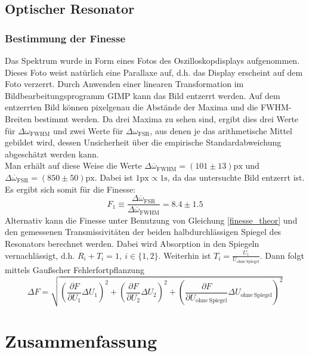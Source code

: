 \documentclass[11pt,a4paper,oneside]{scrartcl}
\begin{document}
\subsection{Optischer Resonator}
\subsubsection{Bestimmung der Finesse}
Das Spektrum wurde in Form eines Fotos des Oszilloskopdisplays aufgenommen. Dieses Foto weist natürlich eine Parallaxe auf, d.h. das Display erscheint auf dem Foto verzerrt. Durch Anwenden einer linearen Transformation im Bildbearbeitungsprogramm GIMP kann das Bild entzerrt werden. Auf dem entzerrten Bild können pixelgenau die Abstände der Maxima und die FWHM-Breiten bestimmt werden. Da drei Maxima zu sehen sind, ergibt dies drei Werte für $\Delta\omega_{\mathrm{FWHM}}$ und zwei Werte für $\Delta\omega_{\mathrm{FSR}}$, aus denen je das arithmetische Mittel gebildet wird, dessen Unsicherheit über die empirische Standardabweichung abgeschätzt werden kann.\\
Man erhält auf diese Weise die Werte $\Delta\overline\omega_{\mathrm{FWHM}}=(101\pm13)\mathrm{px}$ und $\Delta\overline\omega_{\mathrm{FSR}}=(850\pm50)\mathrm{px}$. Dabei ist $1\mathrm{px}\propto 1\mathrm s$, da das untersuchte Bild entzerrt ist. \\
Es ergibt sich somit für die Finesse:
\begin{equation}
F_1\equiv \frac{\Delta\overline\omega_{\mathrm{FSR}}}{\Delta\overline\omega_{\mathrm{FWHM}}}=8.4\pm1.5
\end{equation}
Alternativ kann die Finesse unter Benutzung von Gleichung \ref{finesse_theor} und den gemessenen Transmissivitäten der beiden halbdurchlässigen Spiegel des Resonators berechnet werden. Dabei wird Absorption in den Spiegeln vernachlässigt, d.h. $R_i+T_i=1,\ i\in\{1,2\}$. Weiterhin ist $T_i=\frac{U_i}{U_{\mathrm{ohne}\ \mathrm{Spiegel}}}$. Dann folgt mittels Gaußscher Fehlerfortpflanzung \begin{equation}
\Delta F = \sqrt{\left(\frac{\partial F}{\partial U_1}\Delta U_1\right)^2+\left(\frac{\partial F}{\partial U_2}\Delta U_2\right)^2+\left(\frac{\partial F}{\partial U_{\mathrm{ohne}\ \mathrm{Spiegel}}}\Delta U_{\mathrm{ohne}\ \mathrm{Spiegel}}\right)^2}
\end{equation}
\section{Zusammenfassung}
\newpage
\end{document}
